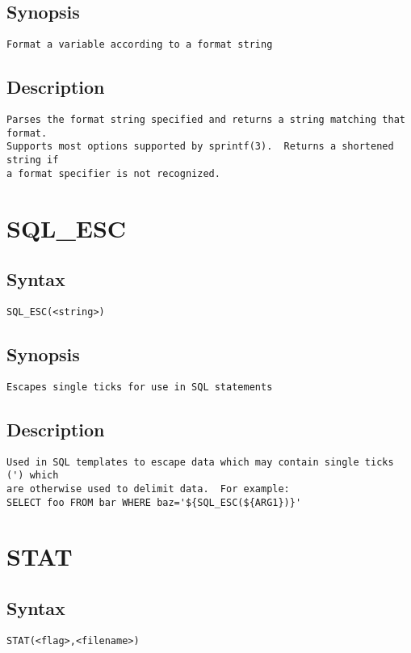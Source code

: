 \subsection{Synopsis}
\begin{verbatim}
Format a variable according to a format string
\end{verbatim}
\subsection{Description}
\begin{verbatim}
Parses the format string specified and returns a string matching that format.
Supports most options supported by sprintf(3).  Returns a shortened string if
a format specifier is not recognized.

\end{verbatim}


\section{SQL\_ESC}
\subsection{Syntax}
\begin{verbatim}
SQL_ESC(<string>)
\end{verbatim}
\subsection{Synopsis}
\begin{verbatim}
Escapes single ticks for use in SQL statements
\end{verbatim}
\subsection{Description}
\begin{verbatim}
Used in SQL templates to escape data which may contain single ticks (') which
are otherwise used to delimit data.  For example:
SELECT foo FROM bar WHERE baz='${SQL_ESC(${ARG1})}'

\end{verbatim}


\section{STAT}
\subsection{Syntax}
\begin{verbatim}
STAT(<flag>,<filename>)
\end{verbatim}
